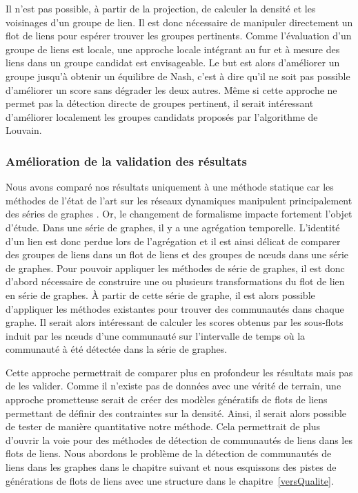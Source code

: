 Il n'est pas possible, à partir de la projection, de calculer la densité et les voisinages d'un groupe de lien.
Il est donc nécessaire de manipuler directement un flot de liens pour espérer trouver les groupes pertinents.
Comme l'évaluation d'un groupe de liens est locale, une approche locale intégrant au fur et à mesure des liens dans un groupe candidat est envisageable.
Le but est alors d'améliorer un groupe jusqu'à obtenir un équilibre de Nash, c'est à dire qu'il ne soit pas possible d'améliorer un score sans dégrader les deux autres.
Même si cette approche ne permet pas la détection directe de groupes pertinent, il serait intéressant d'améliorer localement les groupes candidats proposés par l'algorithme de Louvain.


\subsubsection{Amélioration de la validation des résultats}

Nous avons comparé nos résultats uniquement à une méthode statique car les méthodes de l'état de l'art sur les réseaux dynamiques manipulent principalement des séries de graphes .
Or, le changement de formalisme impacte fortement l'objet d'étude.
Dans une série de graphes, il y a une agrégation temporelle.
L'identité d'un lien est donc perdue lors de l'agrégation et il est ainsi délicat de comparer des groupes de liens dans un flot de liens et des groupes de n\oe uds dans une série de graphes.
Pour pouvoir appliquer les méthodes de série de graphes, il est donc d'abord nécessaire de construire une ou plusieurs transformations du flot de lien en série de graphes.
\`A partir de cette série de graphe, il est alors possible d'appliquer les méthodes existantes pour trouver des communautés dans chaque graphe.
Il serait alors intéressant de calculer les scores obtenus par les sous-flots induit par les n\oe uds d'une communauté sur l'intervalle de temps où la communauté à été détectée dans la série de graphes.


Cette approche permettrait de comparer plus en profondeur les résultats mais pas de les valider.
Comme il n'existe pas de données avec une vérité de terrain, une approche prometteuse serait de créer des modèles génératifs de flots de liens permettant de définir des contraintes sur la densité.
Ainsi, il serait alors possible de tester de manière quantitative notre méthode.
Cela permettrait de plus d'ouvrir la voie pour des méthodes de détection de communautés de liens dans les flots de liens.
Nous abordons le problème de la détection de communautés de liens dans les graphes dans le chapitre suivant et nous esquissons des pistes de générations de flots de liens avec une structure dans le chapitre~\ref{versQualite}.